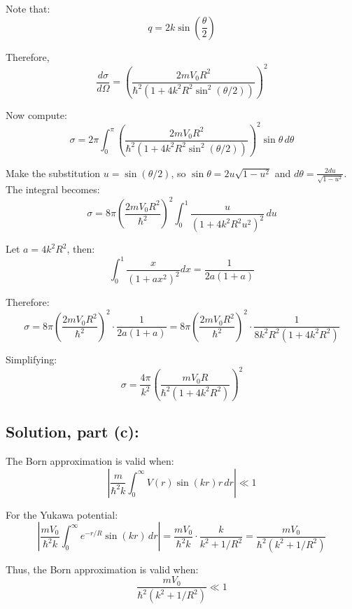 \documentclass[12pt]{article}
\begin{document}
        Note that:
        \[
            q = 2k \sin\left( \frac{\theta}{2} \right)
        \]
        
        Therefore,
        \[
            \frac{d\sigma}{d\Omega} = \left( \frac{2m V_0 R^2}{\hbar^2 (1 + 4k^2 R^2 \sin^2(\theta/2))} \right)^2
        \]
        
        Now compute:
        \[
            \sigma = 2\pi \int_0^\pi \left( \frac{2m V_0 R^2}{\hbar^2 (1 + 4k^2 R^2 \sin^2(\theta/2))} \right)^2 \sin\theta \, d\theta
        \]
        
        Make the substitution \( u = \sin(\theta/2) \), so \( \sin\theta = 2u \sqrt{1 - u^2} \) and \( d\theta = \frac{2 du}{\sqrt{1 - u^2}} \). The integral becomes:
        \[
            \sigma = 8\pi \left( \frac{2m V_0 R^2}{\hbar^2} \right)^2 \int_0^1 \frac{u}{(1 + 4k^2 R^2 u^2)^2} \, du
        \]
        
        Let \( a = 4k^2 R^2 \), then:
        \[
        \int_0^1 \frac{x}{(1 + a x^2)^2} dx = \frac{1}{2a(1 + a)}
        \]
        
        Therefore:
        \[
        \sigma = 8\pi \left( \frac{2m V_0 R^2}{\hbar^2} \right)^2 \cdot \frac{1}{2a(1 + a)}
        = 8\pi \left( \frac{2m V_0 R^2}{\hbar^2} \right)^2 \cdot \frac{1}{8k^2 R^2 (1 + 4k^2 R^2)}
        \]
        
        Simplifying:
        \[
        \sigma = \frac{4\pi}{k^2} \left( \frac{m V_0 R}{\hbar^2 (1 + 4k^2 R^2)} \right)^2
        \]

    \subsection{Solution, part (c):}
        The Born approximation is valid when:
        \[
            \left| \frac{m}{\hbar^2 k} \int_0^\infty V(r) \sin(kr) r \, dr \right| \ll 1
        \]
        
        For the Yukawa potential:
        \[
            \left| \frac{m V_0}{\hbar^2 k} \int_0^\infty e^{-r/R} \sin(kr) \, dr \right|
            = \frac{m V_0}{\hbar^2 k} \cdot \frac{k}{k^2 + 1/R^2}
            = \frac{m V_0}{\hbar^2 (k^2 + 1/R^2)}
        \]
        
        Thus, the Born approximation is valid when:
        \[
            \frac{m V_0}{\hbar^2 (k^2 + 1/R^2)} \ll 1
        \]
\end{document}
